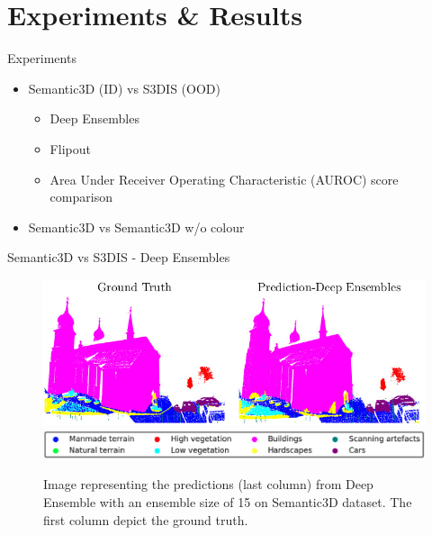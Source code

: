 \documentclass[aspectratio=169]{beamer}
\begin{document}
\section{Experiments \& Results}
\begin{frame}[noframenumbering]{Experiments}
    \begin{itemize}
        \item Semantic3D (ID) vs S3DIS (OOD)
        \begin{itemize}
            \item Deep Ensembles
            \item Flipout
            \item Area Under Receiver Operating Characteristic (AUROC) score comparison
        \end{itemize}
        \item Semantic3D vs Semantic3D w/o colour
    \end{itemize}
\end{frame}
\begin{frame}{Semantic3D vs S3DIS - Deep Ensembles}
    \begin{figure}
        \centering
        \includegraphics[scale=0.5]{images/sem3d/Sem3d_DE_output.jpg}
        \includegraphics[scale=0.25]{images/legend.jpg}
        \caption{Image representing the predictions (last column) from Deep Ensemble with an ensemble size
        of 15 on Semantic3D dataset. The first column depict the ground truth.}
        \label{fig:sem3d_de_op}
    \end{figure}
\end{frame}
\end{document}
